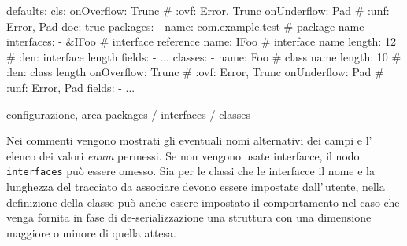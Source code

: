 \documentclass[a4paper,10pt]{report}
\newif\ifesource
\newenvironment{elisting}[1][H]
  {\captionsetup{aboveskip=0pt}\begin{listing}[#1]}
  {\end{listing}%
}
\begin{document}
\ifesource
\begin{figure*}[!htb]
\begin{lstlisting}[language=yaml, 
caption={configurazione, area packages / interfaces / classes}, 
label=lst:pakg-conf]
defaults:
  cls:
    onOverflow: Trunc   # :ovf: Error, Trunc
    onUnderflow: Pad    # :unf: Error, Pad
    doc: true
packages:
  - name: com.example.test  # package name
    interfaces:
      - &IFoo         (*\color{purple}{\# interface reference}*)
        name: IFoo    # interface name
        length: 12    # :len: interface length
        fields:
          - ...
    classes:
      - name: Foo           # class name
        length: 10          # :len: class length
        onOverflow: Trunc   # :ovf: Error, Trunc
        onUnderflow: Pad    # :unf: Error, Pad
        fields:
          - ...
\end{lstlisting}
\end{figure*}
\else
\begin{elisting}[!htb]
\begin{yamlcode}
defaults:
  cls:
    onOverflow: Trunc   # :ovf: Error, Trunc
    onUnderflow: Pad    # :unf: Error, Pad
    doc: true
packages:
  - name: com.example.test  # package name
    interfaces:
      - &IFoo         # interface reference
        name: IFoo    # interface name
        length: 12    # :len: interface length
        fields:
          - ...
    classes:
      - name: Foo           # class name
        length: 10          # :len: class length
        onOverflow: Trunc   # :ovf: Error, Trunc
        onUnderflow: Pad    # :unf: Error, Pad
        fields:
          - ...
\end{yamlcode}
\caption{configurazione, area packages / interfaces / classes}
\label{lst:pakg-conf}
\end{elisting}
\fi
Nei commenti vengono mostrati gli eventuali nomi alternativi dei campi e 
l'\,elenco dei valori \textsl{enum} permessi.
Se non vengono usate interfacce, il nodo \texttt{interfaces} può essere omesso.
Sia per le classi che le interfacce il nome e la lunghezza del tracciato da 
associare devono essere impostate dall'\,utente, nella definizione della classe
può anche essere impostato il comportamento nel caso che venga fornita in fase
di de-serializzazione una struttura con una dimensione maggiore o minore di 
quella attesa.
\end{document}

